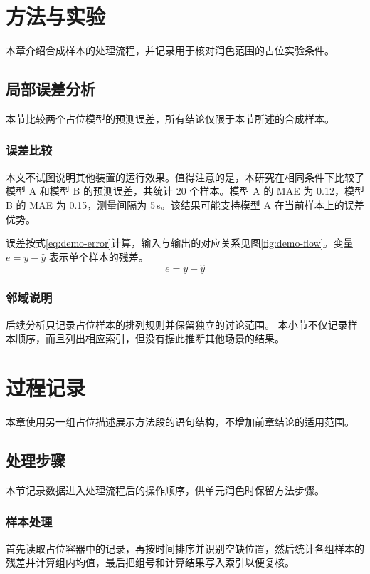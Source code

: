 \documentclass{ctexbook}
\begin{document}
\chapter{方法与实验}
本章介绍合成样本的处理流程，并记录用于核对润色范围的占位实验条件。

\section{局部误差分析}
本节比较两个占位模型的预测误差，所有结论仅限于本节所述的合成样本。

\subsection{误差比较}
本文不试图说明其他装置的运行效果。值得注意的是，本研究在相同条件下比较了模型 A 和模型 B 的预测误差，共统计 20 个样本。模型 A 的 MAE 为 0.12，模型 B 的 MAE 为 0.15，测量间隔为 5\,s。该结果可能支持模型 A 在当前样本上的误差优势\cite{demo2026a,demo2026b}。

误差按式\eqref{eq:demo-error}计算，输入与输出的对应关系见图\ref{fig:demo-flow}。变量 $e=y-\hat{y}$ 表示单个样本的残差。
\begin{equation}
e=y-\hat{y}
\label{eq:demo-error}
\end{equation}

\subsection{邻域说明}
后续分析只记录占位样本的排列规则并保留独立的讨论范围。
本小节不仅记录样本顺序，而且列出相应索引，但没有据此推断其他场景的结果。

\chapter{过程记录}
本章使用另一组占位描述展示方法段的语句结构，不增加前章结论的适用范围。

\section{处理步骤}
本节记录数据进入处理流程后的操作顺序，供单元润色时保留方法步骤。

\subsection{样本处理}
首先读取占位容器中的记录，再按时间排序并识别空缺位置，然后统计各组样本的残差并计算组内均值，最后把组号和计算结果写入索引以便复核。
\end{document}
